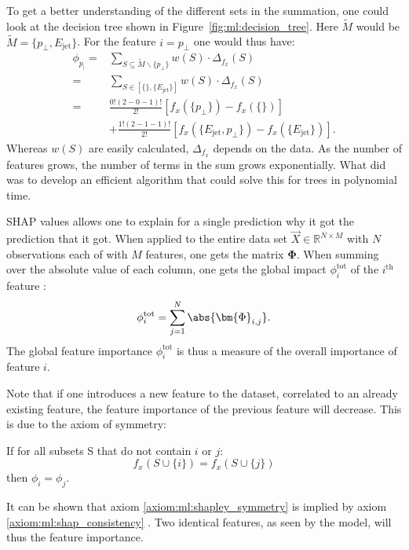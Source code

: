 To get a better understanding of the different sets in the summation, one could look at the decision tree shown in Figure~\ref{fig:ml:decision_tree}. Here $\widetilde{M}$ would be $\widetilde{M}=\{p_\perp, E_\mathrm{jet} \}$. For the feature $i=p_\perp $ one would thus have:
\begin{equation}
  \begin{split}
    \phi_{p_\vert} = & \sum_{S \subseteq \widetilde{M} \backslash \{p_\perp \}} w(S)  \cdot\Delta_{f_x}(S)  \\
                   = & \sum_{S \in \left[\{\}, \{E_\mathrm{jet}\} \right]} w(S)  \cdot\Delta_{f_x}(S)  \\
                   = & \frac{0! (2-0-1)!}{2!}  [ f_x(\{p_\perp\}) - f_x(\{\})]  \\ 
                     & +    \frac{1! (2-1-1)!}{2!}  [f_x(\{ E_\mathrm{jet}, p_\perp \}) - f_x(\{ E_\mathrm{jet} \})].
  \end{split}
\end{equation}
Whereas $w(S)$ are easily calculated, $\Delta_{f_x}$ depends on the data. As the number of features grows, the number of terms in the sum grows exponentially. What \citet{lundbergConsistentIndividualizedFeature2019} did was to develop an efficient algorithm that could solve this for trees in polynomial time. 

SHAP values allows one to explain for a single prediction why it got the prediction that it got. When applied to the entire data set $\vec{X} \in \mathbb{R}^{N \times M}$ with $N$ observations each of with $M$ features, one gets the matrix $\bm{\Phi}$. When summing over the absolute value of each column, one gets the global impact $\phi_i^\mathrm{tot}$ of the $i^{\mathrm{th}}$ feature \citep{lundbergConsistentIndividualizedFeature2019}:
\begin{equation}
  \phi_i^\mathrm{tot} = \sum_{j=1}^N \abs{ \bm{\Phi}_{i, j} }.
\end{equation}
The global feature importance $\phi_i^\mathrm{tot}$ is thus a measure of the overall importance of feature $i$. 

Note that if one introduces a new feature to the dataset, correlated to an already existing feature, the feature importance of the previous feature will decrease. 
This is due to the axiom of symmetry:
\begin{axiom}[Symmetry]
  \label{axiom:ml:shapley_symmetry}
  If for all subsets S that do not contain $i$ or $j$: 
  \begin{equation}
    f_x(S \cup \{i\}) = f_x(S \cup \{j\})
  \end{equation}
  then $\phi_i = \phi_j$.
\end{axiom}
It can be shown that axiom \ref{axiom:ml:shapley_symmetry} is implied by axiom \ref{axiom:ml:shap_consistency}  \citep[Supp. Material]{Lundberg:2017}. Two identical features, as seen by the model, will thus  the feature importance.
